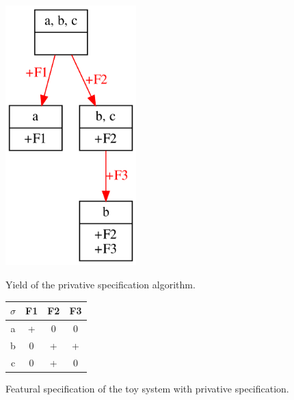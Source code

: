 \documentclass[12pt, oneside]{article}   	%
\begin{document}
\begin{figure}[htb!]
	\centering
	\begin{minipage}{0.45\textwidth}
		\centering
		\includegraphics[width=0.45\textwidth]{toy_system_privative.png}
		\caption{Yield of the privative specification algorithm.}\label{fig:toy_system_privative}
	\end{minipage}
	\begin{minipage}{0.45\textwidth}
		\centering
		\captionsetup{type=table} %
		\begin{tabular} {|c||c|c|c|}
			\hline
			$\sigma$ & F1 & F2 & F3 \\ \hline
			a & + & 0 & 0 \\
			b & 0 & + & + \\
			c & 0 & + & 0  \\
			\hline
		\end{tabular}
		\caption{Featural specification of the toy system with privative specification.}\label{table:toy_system_privative}
	\end{minipage}
\end{figure}

\end{document}
